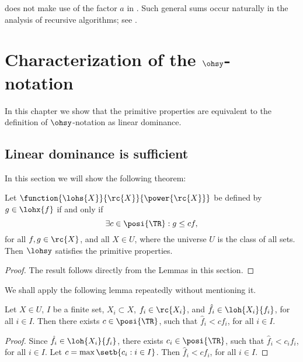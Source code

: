 \documentclass[b5paper, english, oneside]{memoir}
\begin{document}
\begin{note}
 does not make use of the factor $a$ in . Such general sums occur naturally in the analysis of recursive algorithms; see .
\end{note}

\chapter{Characterization of the \texorpdfstring{$\ohsy$}{O}-notation}
\label{Characterization}

In this chapter we show that the primitive properties are equivalent to the definition of $\ohsy$-notation as linear dominance.

\section{Linear dominance is sufficient}
\label{SufficientDefinition}

In this section we will show the following theorem:

\begin{theorem}
\label{LinearImpliesPrimitive}
Let $\function{\lohs{X}}{\rc{X}}{\power{\rc{X}}}$ be defined by $g \in \lohx{f}$ if and only if
\begin{equation}
\exists c \in \posi{\TR}: g \leq c f,
\end{equation}
for all $f, g \in \rc{X}$, and all $X \in U$, where the universe $U$ is the class of all sets. Then $\lohsy$ satisfies the primitive properties.
\end{theorem}

\begin{proof}
The result follows directly from the Lemmas in this section.
\end{proof}

We shall apply the following lemma repeatedly without mentioning it.

\begin{lemma}
\label{LinearSingleConstantLemma}
Let $X \in U$, $I$ be a finite set, $X_i \subset X$, $f_i \in \rc{X_i}$, and $\hat{f}_i \in \loh{X_i}{f_i}$, for all $i \in I$. Then there exists $c \in \posi{\TR}$, such that $\hat{f}_i \lt c f_i$, for all $i \in I$.
\end{lemma}

\begin{proof}
Since $\hat{f}_i \in \loh{X_i}{f_i}$, there exists $c_i \in \posi{\TR}$, such that $\hat{f}_i \lt c_i f_i$, for all $i \in I$. Let $c = \max \setb{c_i : i \in I}$. Then $\hat{f}_i \lt c f_i$, for all $i \in I$.
\end{proof}
\end{document}
